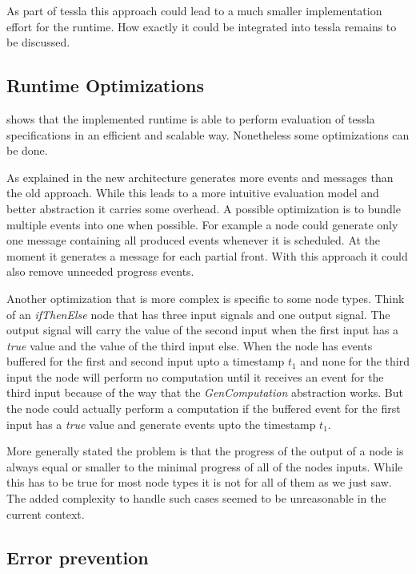 As part of \gls{tessla} this approach could lead to a much smaller implementation effort for the runtime.
How exactly it could be integrated into \gls{tessla} remains to be discussed.

\subsection{Runtime Optimizations}
\label{sec:conclusion:further_work:runtime_optimizations}

 shows that the implemented runtime is able to perform evaluation of \gls{tessla} specifications in an efficient and scalable way.
Nonetheless some optimizations can be done.

As explained in  the new architecture generates more events and messages than the old approach.
While this leads to a more intuitive evaluation model and better abstraction it carries some overhead.
A possible optimization is to bundle multiple events into one when possible.
For example a node could generate only one message containing all produced events whenever it is scheduled.
At the moment it generates a message for each partial front.
With this approach it could also remove unneeded progress events.

Another optimization that is more complex is specific to some node types.
Think of an \emph{ifThenElse} node that has three input signals and one output signal.
The output signal will carry the value of the second input when the first input has a \emph{true} value and the value of the third input else.
When the node has events buffered for the first and second input upto a timestamp \(t_1\) and none for the third input the node will perform no computation until it receives an event for the third input because of the way that the \emph{GenComputation} abstraction works.
But the node could actually perform a computation if the buffered event for the first input has a \emph{true} value and generate events upto the timestamp \(t_1\).

More generally stated the problem is that the progress of the output of a node is always equal or smaller to the minimal progress of all of the nodes inputs.
While this has to be true for most node types it is not for all of them as we just saw.
The added complexity to handle such cases seemed to be unreasonable in the current context.

\subsection{Error prevention}
\label{sec:conclusion:further_work:error_prevention}

